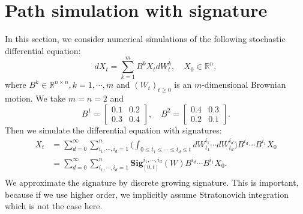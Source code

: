 \documentclass[12pt]{report}
\theoremstyle{definition}
\theoremstyle{remark}
\begin{document}
\section{Path simulation with signature}
In this section, we consider numerical simulations of the following stochastic differential equation:
\begin{equation*}
  dX_t = \sum_{k=1}^{m} B^{k}X_{t}dW^{k}_{t},\quad X_{0}\in \mathbb{R}^{n},
\end{equation*}
where $B^{k} \in \mathbb{R}^{n\times n}, k = 1,\cdots, m$ and $(W_{t})_{t\geq 0}$ is an $m$-dimensional Brownian motion. We take $m=n=2$ and 
\begin{equation*}
  B^{1} = \begin{bmatrix}
    0.1& 0.2\\
    0.3& 0.4
  \end{bmatrix},\quad 
  B^{2} = \begin{bmatrix}
    0.4& 0.3\\
    0.2& 0.1
  \end{bmatrix}.
\end{equation*}
Then we simulate the differential equation with signatures:
\begin{equation*}
  \begin{split}
    X_t &= \sum_{d = 0}^{\infty}\sum_{i_{1},\cdots,i_{d} = 1}^{n} \bigg(\int_{0\leq t_{1}\leq\cdots\leq t_{d}\leq t}dW^{i_{1}}_{t_{1}}\cdots dW^{i_{d}}_{t_{d}}\bigg)B^{i_{d}}\cdots B^{i_{1}} X_{0}\\
    &= \sum_{d = 0}^{\infty}\sum_{i_{1},\cdots,i_{d} = 1}^{n} \mathbf{Sig}^{i_{1},\cdots,i_{d}}_{[0,t]}(W) B^{i_{d}}\cdots B^{i_{1}} X_{0}.\\
  \end{split}
\end{equation*}
We approximate the signature by discrete growing signature. This is important, because if we use higher order, we implicitly assume Stratonovich integration which is not the case here. 
\end{document}
